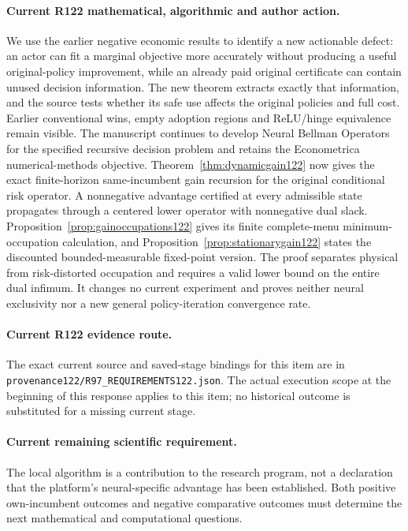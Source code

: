 \paragraph{Current R122 mathematical, algorithmic and author action.}
We use the earlier negative economic results to identify a new actionable defect: an actor can fit a marginal objective more accurately without producing a useful original-policy improvement, while an already paid original certificate can contain unused decision information. The new theorem extracts exactly that information, and the source tests whether its safe use affects the original policies and full cost. Earlier conventional wins, empty adoption regions and ReLU/hinge equivalence remain visible. The manuscript continues to develop Neural Bellman Operators for the specified recursive decision problem and retains the Econometrica numerical-methods objective. Theorem~\ref{thm:dynamicgain122} now gives the exact finite-horizon same-incumbent gain recursion for the original conditional risk operator. A nonnegative advantage certified at every admissible state propagates through a centered lower operator with nonnegative dual slack. Proposition~\ref{prop:gainoccupations122} gives its finite complete-menu minimum-occupation calculation, and Proposition~\ref{prop:stationarygain122} states the discounted bounded-measurable fixed-point version. The proof separates physical from risk-distorted occupation and requires a valid lower bound on the entire dual infimum. It changes no current experiment and proves neither neural exclusivity nor a new general policy-iteration convergence rate.
\paragraph{Current R122 evidence route.}
The exact current source and saved-stage bindings for this item are in \nolinkurl{provenance122/R97_REQUIREMENTS122.json}. The actual execution scope at the beginning of this response applies to this item; no historical outcome is substituted for a missing current stage.
\paragraph{Current remaining scientific requirement.}
The local algorithm is a contribution to the research program, not a declaration that the platform's neural-specific advantage has been established. Both positive own-incumbent outcomes and negative comparative outcomes must determine the next mathematical and computational questions.


